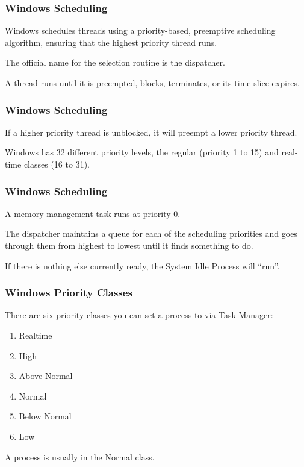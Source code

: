 \begin{frame}
\frametitle{Windows Scheduling}

Windows schedules threads using a priority-based, preemptive scheduling algorithm, ensuring that the highest priority thread runs. 

The official name for the selection routine is the \alert{dispatcher}.

A thread runs until it is preempted, blocks, terminates, or its time slice expires. 

\end{frame}

\begin{frame}
\frametitle{Windows Scheduling}

If a higher priority thread is unblocked, it will preempt a lower priority thread. 

Windows has 32 different priority levels, the regular (priority 1 to 15) and real-time classes (16 to 31). 

\end{frame}

\begin{frame}
\frametitle{Windows Scheduling}


A memory management task runs at priority 0.

The dispatcher maintains a queue for each of the scheduling priorities and goes through them from highest to lowest until it finds something to do.

If there is nothing else currently ready, the System Idle Process will ``run''.

\end{frame}

\begin{frame}
\frametitle{Windows Priority Classes}

There are six priority classes you can set a process to via Task Manager:

\begin{enumerate}
	\item Realtime
	\item High
	\item Above Normal
	\item Normal
	\item Below Normal
	\item Low
\end{enumerate}

A process is usually in the Normal class.

\end{frame}

